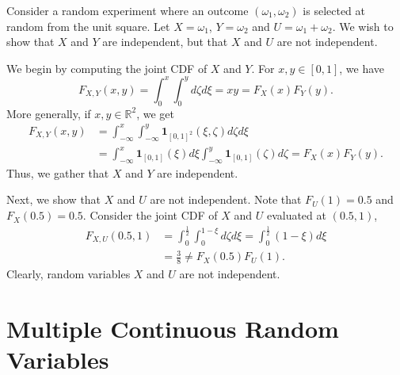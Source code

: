 \begin{example}
Consider a random experiment where an outcome $(\omega_1, \omega_2)$ is selected at random from the unit square.
Let $X = \omega_1$, $Y = \omega_2$ and $U = \omega_1 + \omega_2$.
We wish to show that $X$ and $Y$ are independent, but that $X$ and $U$ are not independent.

We begin by computing the joint CDF of $X$ and $Y$.
For $x,y \in [0,1]$, we have
\begin{equation*}
F_{X,Y}(x,y) = \int_0^{x} \int_0^{y} d\zeta d\xi
= x y = F_X(x) F_Y(y) .
\end{equation*}
More generally, if $x, y \in \mathbb{R}^2$, we get
\begin{equation*}
\begin{split}
F_{X,Y}(x,y)
&= \int_{-\infty}^{x} \int_{-\infty}^{y}
\mathbf{1}_{[0,1]^2} (\xi, \zeta) d\zeta d\xi \\
&= \int_{-\infty}^{x} \mathbf{1}_{[0,1]} (\xi) d \xi
\int_{-\infty}^{y} \mathbf{1}_{[0,1]} (\zeta) d\zeta
= F_X(x) F_Y(y) .
\end{split}
\end{equation*}
Thus, we gather that $X$ and $Y$ are independent.

Next, we show that $X$ and $U$ are not independent.
Note that $F_U (1) = 0.5$ and $F_X (0.5) = 0.5$.
Consider the joint CDF of $X$ and $U$ evaluated at $(0.5, 1)$,
\begin{equation*}
\begin{split}
F_{X,U} (0.5, 1)
&= \int_{0}^{\frac{1}{2}} \int_{0}^{1-\xi} d\zeta d\xi
= \int_{0}^{\frac{1}{2}} (1 - \xi) d\xi \\
&= \frac{3}{8}
\neq F_X (0.5) F_U(1) .
\end{split}
\end{equation*}
Clearly, random variables $X$ and $U$ are not independent.
\end{example}


\section{Multiple Continuous Random Variables}

